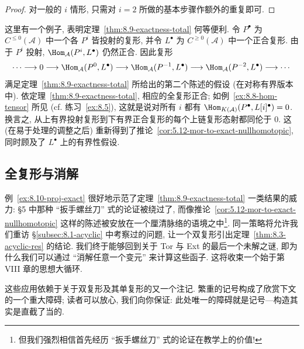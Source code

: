 \begin{proof}
对一般的 $i$ 情形, 只需对 $i=2$ 所做的基本步骤作额外的重复即可.
\end{proof}

\begin{example}\label{ex:8.10-proj-exact}
这里有一个例子, 表明定理~\ref{thm:8.9-exactness-total} 何等便利. 令 $P^\bullet$ 为 $C^{\le 0}(\mathcal{A})$ 中一个各 $P^i$ 皆投射的复形, 并令 $L^\bullet$ 为 $C^{\ge 0}(\mathcal{A})$ 中一个正合复形. 由于 $P^i$ 投射, $\Hom_{\mathcal{A}}(P^i, L^\bullet)$ 仍然正合. 因此复形
\[
\cdots\longrightarrow 0\longrightarrow\Hom_{\mathcal A}(P^0,L^\bullet)\longrightarrow\Hom_{\mathcal A}(P^{-1},L^\bullet)\longrightarrow\Hom_{\mathcal A}(P^{-2},L^\bullet)\longrightarrow\cdots
\]
满足定理~\ref{thm:8.9-exactness-total} 所给出的第二个陈述的假设 (在对称有界版本中). 依定理~\ref{thm:8.9-exactness-total}, 相应的全复形正合; 如例~\ref{ex:8.8-hom-tensor} 所见 (cf. 练习~\ref{ex:8.5}), 这就是说对所有 $i$ 都有 $\Hom_{K(\mathcal{A})}(P^\bullet, L[i]^\bullet)=0$. 换言之, 从上有界投射复形到下有界正合复形的每个上链复形态射都同伦于 $0$. 这 (在易于处理的调整之后) 重新得到了推论~\ref{cor:5.12-mor-to-exact-nullhomotopic}, 同时顾及了 $L^\bullet$ 上的有界性假设.
\end{example}

\subsection{全复形与消解}
\label{subsec:8.4-total-resolutions}

例~\ref{ex:8.10-proj-exact} 很好地示范了定理~\ref{thm:8.9-exactness-total} 一类结果的威力: §5 中那种 ``扳手螺丝刀'' 式的论证被绕过了, 而像推论~\ref{cor:5.12-mor-to-exact-nullhomotopic} 这样的陈述被安放在一个厘清脉络的语境之中\footnote{但我们强烈相信首先经历 ``扳手螺丝刀'' 式的论证在教学上的价值!}. 同一策略将允许我们重访 \S\ref{subsec:8.1-acyclic} 中考察过的问题, 让一个双复形引出定理~\ref{thm:8.3-acyclic-res} 的结论. 我们终于能够回到关于 Tor 与 Ext 的最后一个未解之谜, 即为什么我们可以通过 ``消解任意一个变元'' 来计算这些函子. 这将收束一个始于第 VIII 章的思想大循环.

这些应用依赖于关于双复形及其单复形的又一个注记. 繁重的记号构成了欣赏下文的一个重大障碍; 读者可以放心, 我们向你保证: 此处唯一的障碍就是记号---构造其实是直截了当的.

